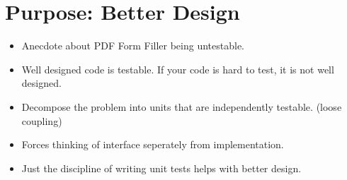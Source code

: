 \documentclass{article}
\begin{document}
\sloppy
\section{Purpose: Better Design}
\begin{itemize}
    \item Anecdote about PDF Form Filler being untestable.
    \item Well designed code is testable. If your code is hard to test, it is
        not well designed.
    \item Decompose the problem into units that are independently testable.
        (loose coupling)
    \item Forces thinking of interface seperately from implementation.
    \item Just the discipline of writing unit tests helps with better design.
\end{itemize}
\end{document}
